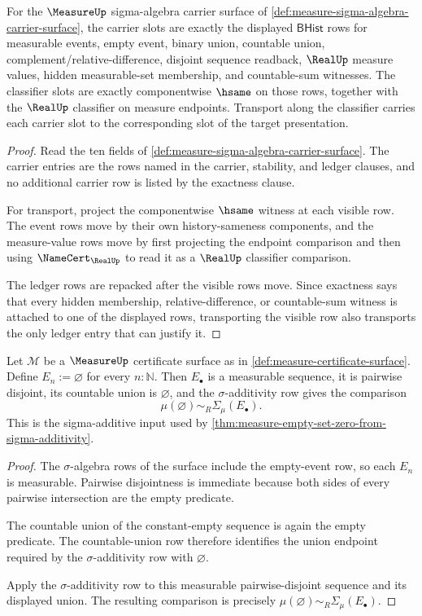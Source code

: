 \begin{theorem}
\label{thm:measure-carrier-classifier-obligation}
For the $\MeasureUp$ sigma-algebra carrier surface of
\autoref{def:measure-sigma-algebra-carrier-surface}, the carrier slots are
exactly the displayed $\mathsf{BHist}$ rows for measurable events, empty event,
binary union, countable union, complement/relative-difference, disjoint
sequence readback, $\RealUp$ measure values, hidden measurable-set membership,
and countable-sum witnesses. The classifier slots are exactly componentwise
$\hsame$ on those rows, together with the $\RealUp$ classifier on measure
endpoints. Transport along the classifier carries each carrier slot to the
corresponding slot of the target presentation.
\end{theorem}
\begin{proof}
Read the ten fields of
\autoref{def:measure-sigma-algebra-carrier-surface}. The carrier entries are
the rows named in the carrier, stability, and ledger clauses, and no additional
carrier row is listed by the exactness clause.

For transport, project the componentwise $\hsame$ witness at each visible row.
The event rows move by their own history-sameness components, and the
measure-value rows move by first projecting the endpoint comparison and then
using $\NameCert_{\RealUp}$ to read it as a $\RealUp$ classifier comparison.

The ledger rows are repacked after the visible rows move. Since exactness says
that every hidden membership, relative-difference, or countable-sum witness is
attached to one of the displayed rows, transporting the visible row also
transports the only ledger entry that can justify it.
\end{proof}

\begin{theorem}
\label{thm:measure-obligation-sigma-additive-row}
Let $\mathcal{M}$ be a $\MeasureUp$ certificate surface as in \autoref{def:measure-certificate-surface}. Define $E_n:=\varnothing$ for every $n:\mathbb{N}$. Then $E_\bullet$ is a measurable sequence, it is pairwise disjoint, its countable union is $\varnothing$, and the $\sigma$-additivity row gives the comparison
$$
\mu(\varnothing)\sim_R\Sigma_\mu(E_\bullet).
$$
This is the sigma-additive input used by \autoref{thm:measure-empty-set-zero-from-sigma-additivity}.
\end{theorem}
\begin{proof}
The $\sigma$-algebra rows of the surface include the empty-event row, so each $E_n$ is measurable. Pairwise disjointness is immediate because both sides of every pairwise intersection are the empty predicate.

The countable union of the constant-empty sequence is again the empty predicate. The countable-union row therefore identifies the union endpoint required by the $\sigma$-additivity row with $\varnothing$.

Apply the $\sigma$-additivity row to this measurable pairwise-disjoint sequence and its displayed union. The resulting comparison is precisely $\mu(\varnothing)\sim_R\Sigma_\mu(E_\bullet)$.
\end{proof}

